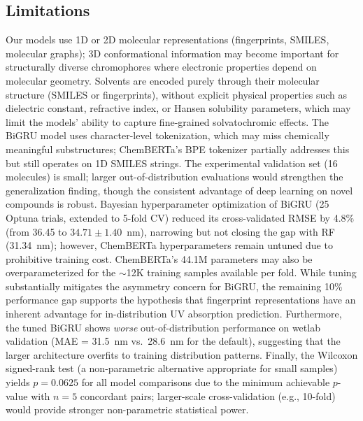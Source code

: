 \subsection*{Limitations}
Our models use 1D or 2D molecular representations (fingerprints, SMILES, molecular graphs); 3D conformational information may become important for structurally diverse chromophores where electronic properties depend on molecular geometry\cite{lupopasini2023excited}.
Solvents are encoded purely through their molecular structure (SMILES or fingerprints), without explicit physical properties such as dielectric constant, refractive index, or Hansen solubility parameters\cite{reichardt2011solvents}, which may limit the models' ability to capture fine-grained solvatochromic effects.
The BiGRU model uses character-level tokenization, which may miss chemically meaningful substructures; ChemBERTa's BPE tokenizer partially addresses this but still operates on 1D SMILES strings.
The experimental validation set (16 molecules) is small; larger out-of-distribution evaluations would strengthen the generalization finding, though the consistent advantage of deep learning on novel compounds is robust.
Bayesian hyperparameter optimization of BiGRU (25 Optuna trials, extended to 5-fold CV) reduced its cross-validated RMSE by 4.8\% (from 36.45 to $34.71 \pm 1.40$~nm), narrowing but not closing the gap with RF (31.34~nm); however, ChemBERTa hyperparameters remain untuned due to prohibitive training cost.
ChemBERTa's 44.1M parameters may also be overparameterized for the $\sim$12K training samples available per fold.
While tuning substantially mitigates the asymmetry concern for BiGRU, the remaining 10\% performance gap supports the hypothesis that fingerprint representations have an inherent advantage for in-distribution UV absorption prediction.
Furthermore, the tuned BiGRU shows \textit{worse} out-of-distribution performance on wetlab validation (MAE = 31.5~nm vs.\ 28.6~nm for the default), suggesting that the larger architecture overfits to training distribution patterns.
Finally, the Wilcoxon signed-rank test (a non-parametric alternative appropriate for small samples) yields $p = 0.0625$ for all model comparisons due to the minimum achievable $p$-value with $n = 5$ concordant pairs; larger-scale cross-validation (e.g., 10-fold) would provide stronger non-parametric statistical power.

